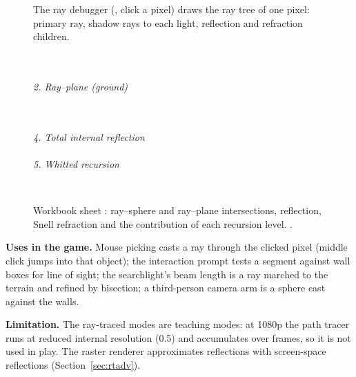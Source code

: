\begin{figure}[htbp]
\centering{}
\caption{The ray debugger (, click a pixel) draws the ray tree of one pixel: primary ray, shadow rays to
each light, reflection and refraction children.}
\label{fig:rttree}
\end{figure}

\begin{figure}[htbp]
\centering
\begin{minipage}[t]{0.49\linewidth}\\[0.5mm]
\\[2mm]{\footnotesize\textit{2. Ray--plane (ground)}}\\[0.5mm]
\end{minipage}\hfill
\begin{minipage}[t]{0.49\linewidth}\\[0.5mm]
\\[2mm]{\footnotesize\textit{4. Total internal reflection}}\\[0.5mm]
\\[2mm]{\footnotesize\textit{5. Whitted recursion}}\\[0.5mm]
\end{minipage}\\[1mm]
{\footnotesize\wbkey}
\caption{Workbook sheet : ray--sphere and
ray--plane intersections, reflection, Snell refraction and the contribution of each recursion level. .}
\label{fig:wb-rt}
\end{figure}

\textbf{Uses in the game.} Mouse picking casts a ray through the clicked pixel (middle click jumps into that object);
the interaction prompt tests a segment against wall boxes for line of sight; the  searchlight's beam length is a
ray marched to the terrain and refined by bisection; a third-person camera arm is a sphere cast against the walls.

\textbf{Limitation.} The ray-traced modes are teaching modes: at 1080p the path tracer runs at reduced internal resolution
(0.5) and accumulates over frames, so it is not used in play. The raster renderer approximates reflections with
screen-space reflections (Section~\ref{sec:rtadv}).
